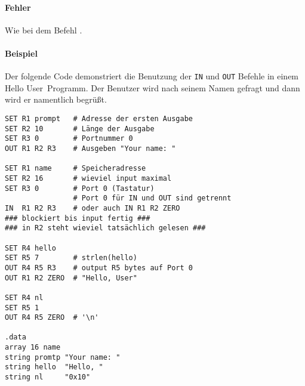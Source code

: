 \paragraph{Fehler}
Wie bei dem Befehl .


\paragraph{Beispiel}
Der folgende Code demonstriert die Benutzung der \texttt{IN} und \texttt{OUT}
Befehle in einem \glqq Hello User\grqq\ Programm. Der Benutzer wird nach seinem
Namen gefragt und dann wird er namentlich begrüßt.

\begin{lstlisting}
SET R1 prompt   # Adresse der ersten Ausgabe
SET R2 10       # Länge der Ausgabe
SET R3 0        # Portnummer 0
OUT R1 R2 R3    # Ausgeben "Your name: "

SET R1 name     # Speicheradresse
SET R2 16       # wieviel input maximal
SET R3 0        # Port 0 (Tastatur)
                # Port 0 für IN und OUT sind getrennt
IN  R1 R2 R3    # oder auch IN R1 R2 ZERO
### blockiert bis input fertig ###
### in R2 steht wieviel tatsächlich gelesen ###

SET R4 hello
SET R5 7        # strlen(hello)
OUT R4 R5 R3    # output R5 bytes auf Port 0
OUT R1 R2 ZERO  # "Hello, User"

SET R4 nl
SET R5 1
OUT R4 R5 ZERO  # '\n'

.data
array 16 name
string promtp "Your name: "
string hello  "Hello, "
string nl     "0x10"
\end{lstlisting}

